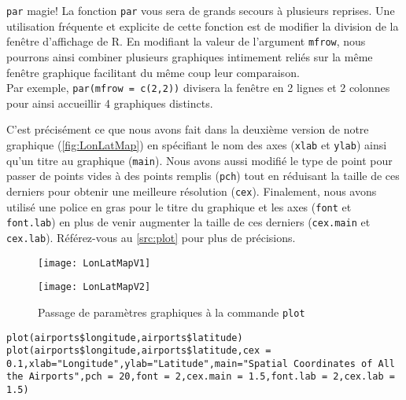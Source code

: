 \begin{moreInfo}{\texttt{par} magie!}
	La fonction \texttt{par} vous sera de grands secours à plusieurs reprises. Une utilisation fréquente et explicite de cette fonction est de modifier la division de la fenêtre d'affichage de R. En modifiant la valeur de l'argument \texttt{mfrow}, nous pourrons ainsi combiner plusieurs graphiques intimement reliés sur la même fenêtre graphique facilitant du même coup leur comparaison. \\
	Par exemple, \texttt{par(mfrow = c(2,2))} divisera la fenêtre en 2 lignes et 2 colonnes pour ainsi accueillir 4 graphiques distincts.
\end{moreInfo}

C'est précisément ce que nous avons fait dans la deuxième version de notre graphique (\autoref{fig:LonLatMap}) en spécifiant le nom des axes (\texttt{xlab} et \texttt{ylab}) ainsi qu'un titre au graphique (\texttt{main}). Nous avons aussi modifié le type de point pour passer de points vides à des points remplis (\texttt{pch}) tout en réduisant la taille de ces derniers pour obtenir une meilleure résolution (\texttt{cex}). Finalement, nous avons utilisé une police en gras pour le titre du graphique et les axes (\texttt{font} et \texttt{font.lab}) en plus de venir augmenter la taille de ces derniers (\texttt{cex.main} et \texttt{cex.lab}). Référez-vous au \autoref{src:plot} pour plus de précisions. \\
	
\begin{figure}
	\begin{minipage}{\textwidth}
		\centering
		\texttt{[image: LonLatMapV1]}
	\end{minipage}
	\newline
	\begin{minipage}{\textwidth}
		\centering
		\texttt{[image: LonLatMapV2]}
	\end{minipage}
	\caption{Passage de paramètres graphiques à la commande \texttt{plot}}
\end{figure}
\label{fig:LonLatMap}

\begin{lstlisting}[caption = Utilisation de la commande \texttt{plot},label=src:plot]
plot(airports$longitude,airports$latitude)
plot(airports$longitude,airports$latitude,cex = 0.1,xlab="Longitude",ylab="Latitude",main="Spatial Coordinates of All the Airports",pch = 20,font = 2,cex.main = 1.5,font.lab = 2,cex.lab = 1.5)
\end{lstlisting}

